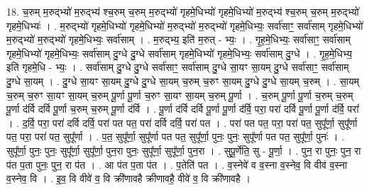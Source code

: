 \documentclass[17pt]{extarticle}
\begin{document}
18. च॒रुम् म॒रुद्भ्यो॑ म॒रुद्भ्य॑ श्च॒रुम् च॒रुम् म॒रुद्भ्यो॑ गृहमे॒धिभ्यो॑ गृहमे॒धिभ्यो॑ म॒रुद्भ्य॑ श्च॒रुम् च॒रुम् म॒रुद्भ्यो॑ गृहमे॒धिभ्यः॑ । . म॒रुद्भ्यो॑ गृहमे॒धिभ्यो॑ गृहमे॒धिभ्यो॑ म॒रुद्भ्यो॑ म॒रुद्भ्यो॑ गृहमे॒धिभ्यः॒ सर्वा॑साꣳ॒॒ सर्वा॑साम् गृहमे॒धिभ्यो॑ म॒रुद्भ्यो॑ म॒रुद्भ्यो॑ गृहमे॒धिभ्यः॒ सर्वा॑साम् । . म॒रुद्भ्य॒ इति॑ म॒रुत् - भ्यः॒ । . गृ॒ह॒मे॒धिभ्यः॒ सर्वा॑साꣳ॒॒ सर्वा॑साम् गृहमे॒धिभ्यो॑ गृहमे॒धिभ्यः॒ सर्वा॑साम् दु॒ग्धे दु॒ग्धे सर्वा॑साम् गृहमे॒धिभ्यो॑ गृहमे॒धिभ्यः॒ सर्वा॑साम् दु॒ग्धे । . गृ॒ह॒मे॒धिभ्य॒ इति॑ गृहमे॒धि - भ्यः॒ । . सर्वा॑साम् दु॒ग्धे दु॒ग्धे सर्वा॑साꣳ॒॒ सर्वा॑साम् दु॒ग्धे सा॒यꣳ सा॒यम् दु॒ग्धे सर्वा॑साꣳ॒॒ सर्वा॑साम् दु॒ग्धे सा॒यम् । . दु॒ग्धे सा॒यꣳ सा॒यम् दु॒ग्धे दु॒ग्धे सा॒यम् च॒रुम् च॒रुꣳ सा॒यम् दु॒ग्धे दु॒ग्धे सा॒यम् च॒रुम् । . सा॒यम् च॒रुम् च॒रुꣳ सा॒यꣳ सा॒यम् च॒रुम् पू॒र्णा पू॒र्णा च॒रुꣳ सा॒यꣳ सा॒यम् च॒रुम् पू॒र्णा । . च॒रुम् पू॒र्णा पू॒र्णा च॒रुम् च॒रुम् पू॒र्णा द॑र्वि दर्वि पू॒र्णा च॒रुम् च॒रुम् पू॒र्णा द॑र्वि । . पू॒र्णा द॑र्वि दर्वि पू॒र्णा पू॒र्णा द॑र्वि॒ परा॒ परा॑ दर्वि पू॒र्णा पू॒र्णा द॑र्वि॒ परा᳚ । . द॒र्वि॒ परा॒ परा॑ दर्वि दर्वि॒ परा॑ पत पत॒ परा॑ दर्वि दर्वि॒ परा॑ पत । . परा॑ पत पत॒ परा॒ परा॑ पत॒ सुपू᳚र्णा॒ सुपू᳚र्णा पत॒ परा॒ परा॑ पत॒ सुपू᳚र्णा । . प॒त॒ सुपू᳚र्णा॒ सुपू᳚र्णा पत पत॒ सुपू᳚र्णा॒ पुनः॒ पुनः॒ सुपू᳚र्णा पत पत॒ सुपू᳚र्णा॒ पुनः॑ । . सुपू᳚र्णा॒ पुनः॒ पुनः॒ सुपू᳚र्णा॒ सुपू᳚र्णा॒ पुन॒रा पुनः॒ सुपू᳚र्णा॒ सुपू᳚र्णा॒ पुन॒रा । . सुपू॒र्णेति॒ सु - पू॒र्णा॒ । . पुन॒ रा पुनः॒ पुन॒ रा प॑त प॒ता पुनः॒ पुन॒ रा प॑त । . आ प॑त प॒ता प॑त । . प॒तेति॑ पत । . व॒स्नेवे॑ व व॒स्ना व॒स्नेव॒ वि वीव॑ व॒स्ना व॒स्नेव॒ वि । . इ॒व॒ वि वीवे॑ व॒ वि क्री॑णावहै क्रीणावहै॒ वीवे॑ व॒ वि क्री॑णावहै । \newline
\end{document}
